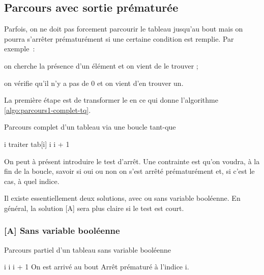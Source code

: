 \subsection{Parcours avec sortie prématurée}

Parfois, on ne doit pas forcement parcourir le tableau jusqu'au bout
mais on pourra s'arrêter prématurément si une certaine condition est remplie.
Par exemple~:
\begin{liste}
\item on cherche la présence d'un élément et on vient de le trouver ;
\item on vérifie qu'il n'y a pas de $0$ et on vient d'en trouver un.
\end{liste}

La première étape est de transformer le  en 
ce qui donne l'algorithme \vref{algo:parcours1-complet-tq}.

\begin{algorithm}[H]
\begin{pseudo}
	\caption{Parcours complet d'un tableau via une boucle tant-que}
	\label{algo:parcours1-complet-tq}
	\Let i 
		\Stmt traiter tab[i]
		\Let i \Gets i + 1
	\EndWhile
\end{pseudo}
\end{algorithm}

On peut à présent introduire le test d'arrêt.
Une contrainte est qu'on voudra, à la fin de la boucle, savoir
si oui ou non on s'est arrêté prématurément et, si c'est le cas,
à quel indice.

Il existe essentiellement deux solutions, avec ou sans variable booléenne.
En général, la solution [A] sera plus claire si le test est court.

\subsubsection*{[A] Sans variable booléenne}

\begin{algorithm}[H]
\begin{pseudo}
	\caption{Parcours partiel d'un tableau sans variable booléenne}
	\label{algo:parcours1-partiel-sans-bool}
	\Let i 
		\Let i \Gets i + 1
	\EndWhile
		\LComment On est arrivé au bout
	\Else
		\LComment Arrêt prématuré à l'indice i.
	\EndIf
\end{pseudo}
\end{algorithm}

